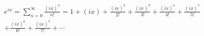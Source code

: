 \documentclass[preview]{standalone}
\begin{document}
\begin{align*}
e^{ix} = \sum_{n=0}^{\infty} \frac{(ix)^n}{n!} = 1 + (ix) + \frac{(ix)^2}{2!} + \frac{(ix)^3}{3!} + \frac{(ix)^4}{4!} + \frac{(ix)^5}{5!} \\ + \frac{(ix)^6}{6!} + \frac{(ix)^7}{7!} + \cdots
\end{align*}
\end{document}
